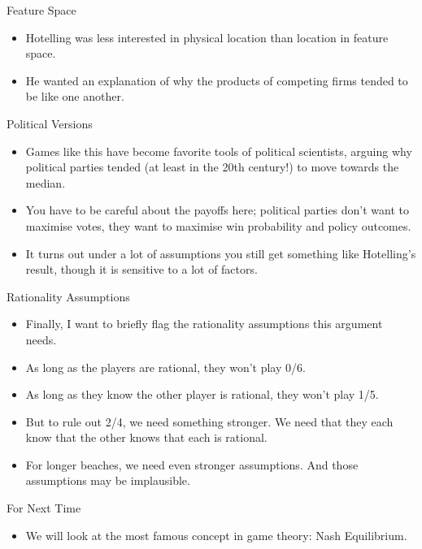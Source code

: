 \documentclass[
  ignorenonframetext,
]{beamer}
\providecommand{\tightlist}{%
  \setlength{\itemsep}{0pt}\setlength{\parskip}{0pt}}
\begin{document}
\begin{frame}{Feature Space}
\protect\hypertarget{feature-space}{}
\begin{itemize}
\tightlist
\item
  Hotelling was less interested in physical location than location in
  feature space.
\item
  He wanted an explanation of why the products of competing firms tended
  to be like one another.
\end{itemize}
\end{frame}

\begin{frame}{Political Versions}
\protect\hypertarget{political-versions}{}
\begin{itemize}
\tightlist
\item
  Games like this have become favorite tools of political scientists,
  arguing why political parties tended (at least in the 20th century!)
  to move towards the median.
\item
  You have to be careful about the payoffs here; political parties don't
  want to maximise votes, they want to maximise win probability and
  policy outcomes.
\item
  It turns out under a lot of assumptions you still get something like
  Hotelling's result, though it is sensitive to a lot of factors.
\end{itemize}
\end{frame}

\begin{frame}{Rationality Assumptions}
\protect\hypertarget{rationality-assumptions}{}
\begin{itemize}
\tightlist
\item
  Finally, I want to briefly flag the rationality assumptions this
  argument needs.
\item
  As long as the players are rational, they won't play 0/6.
\item
  As long as they know the other player is rational, they won't play
  1/5.
\item
  But to rule out 2/4, we need something stronger. We need that they
  each know that the other knows that each is rational.
\item
  For longer beaches, we need even stronger assumptions. And those
  assumptions may be implausible.
\end{itemize}
\end{frame}

\begin{frame}{For Next Time}
\protect\hypertarget{for-next-time}{}
\begin{itemize}
\tightlist
\item
  We will look at the most famous concept in game theory: Nash
  Equilibrium.
\end{itemize}
\end{frame}
\end{document}
